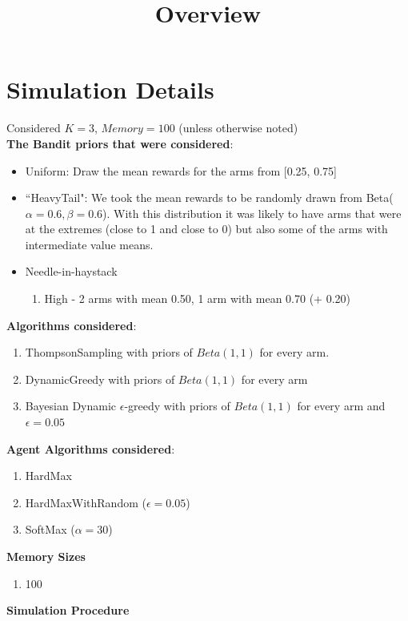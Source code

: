 \documentclass[11pt,letterpaper]{article}
\begin{document}
 

\title{Overview}
\maketitle

\section*{Simulation Details}

Considered $K = 3$, $Memory = 100$ (unless otherwise noted) \\
\textbf{The Bandit priors that were considered}:
\begin{itemize}
\item Uniform: Draw the mean rewards for the arms from [0.25, 0.75]
\item ``HeavyTail": We took the mean rewards to be randomly drawn from Beta($\alpha=0.6,\beta=0.6$). With this distribution it was likely to have arms that were at the extremes (close to 1 and close to 0) but also some of the arms with intermediate value means.
\item Needle-in-haystack
\begin{enumerate}
\item High - 2 arms with mean 0.50, 1 arm with mean 0.70 (+ 0.20)
\end{enumerate}
\end{itemize}
\textbf{Algorithms considered}:
\begin{enumerate}
\item ThompsonSampling with priors of $Beta(1, 1)$ for every arm.
\item DynamicGreedy with priors of $Beta(1, 1)$ for every arm
\item Bayesian Dynamic $\epsilon$-greedy with priors of $Beta(1, 1)$ for every arm and $\epsilon=0.05$
\end{enumerate}
\textbf{Agent Algorithms considered}:
\begin{enumerate}
\item HardMax
\item HardMaxWithRandom ($\epsilon = 0.05$)
\item SoftMax ($\alpha = 30$)
\end{enumerate}
\textbf{Memory Sizes}
\begin{enumerate}
\item 100
\end{enumerate}
\pagebreak
\textbf{Simulation Procedure}
\end{document}
